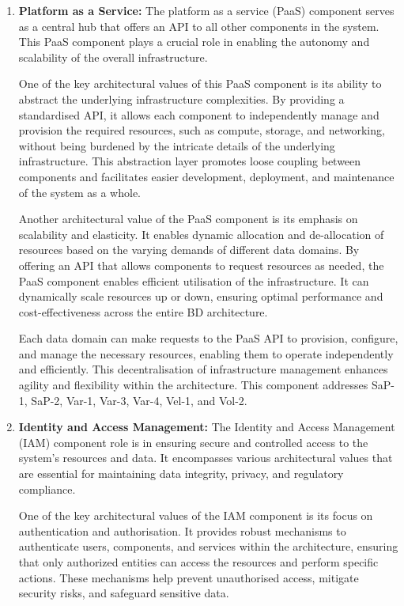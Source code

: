 \documentclass[preprint,12pt]{elsarticle}
\begin{document}
\begin{enumerate}
    \item \textbf{Platform as a Service:} The platform as a service (PaaS) component serves as a central hub that offers an API to all other components in the system. This PaaS component plays a crucial role in enabling the autonomy and scalability of the overall infrastructure.

    One of the key architectural values of this PaaS component is its ability to abstract the underlying infrastructure complexities. By providing a standardised API, it allows each component to independently manage and provision the required resources, such as compute, storage, and networking, without being burdened by the intricate details of the underlying infrastructure. This abstraction layer promotes loose coupling between components and facilitates easier development, deployment, and maintenance of the system as a whole.
    
    Another architectural value of the PaaS component is its emphasis on scalability and elasticity. It enables dynamic allocation and de-allocation of resources based on the varying demands of different data domains. By offering an API that allows components to request resources as needed, the PaaS component enables efficient utilisation of the infrastructure. It can dynamically scale resources up or down, ensuring optimal performance and cost-effectiveness across the entire BD architecture.
    
    Each data domain can make requests to the PaaS API to provision, configure, and manage the necessary resources, enabling them to operate independently and efficiently. This decentralisation of infrastructure management enhances agility and flexibility within the architecture. This component addresses SaP-1, SaP-2, Var-1, Var-3, Var-4, Vel-1, and Vol-2.
    
    \item \textbf{Identity and Access Management:} The Identity and Access Management (IAM) component role is in ensuring secure and controlled access to the system's resources and data. It encompasses various architectural values that are essential for maintaining data integrity, privacy, and regulatory compliance.

    One of the key architectural values of the IAM component is its focus on authentication and authorisation. It provides robust mechanisms to authenticate users, components, and services within the architecture, ensuring that only authorized entities can access the resources and perform specific actions. These mechanisms help prevent unauthorised access, mitigate security risks, and safeguard sensitive data.
    

\end{enumerate}
\end{document}
